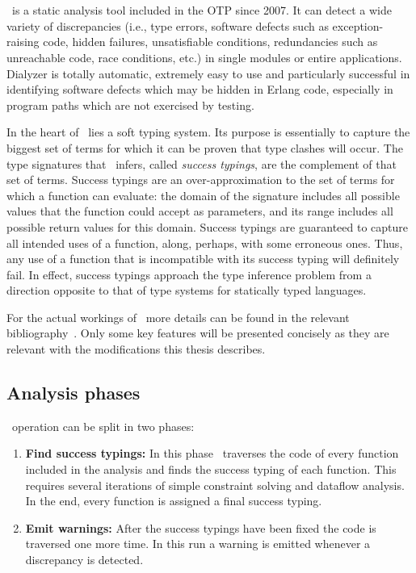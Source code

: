 \section{\dr}
\label{sct:dialyzer_preliminaries}

\dr\ is a static analysis tool included in the OTP since 2007. It can
detect a wide variety of discrepancies (i.e., type errors, software
defects such as exception-raising code, hidden failures, unsatisfiable
conditions, redundancies such as unreachable code, race conditions,
etc.) in single modules or entire applications. Dialyzer is totally
automatic, extremely easy to use and particularly successful in
identifying software defects which may be hidden in Erlang code,
especially in program paths which are not exercised by testing.

In the heart of \dr\ lies a soft typing system. Its purpose is
essentially to capture the biggest set of terms for which it can be
proven that type clashes will occur. The type signatures that
\dr\ infers, called \emph{success typings}, are the complement of that
set of terms. Success typings are an over-approximation to the set of
terms for which a function can evaluate: the domain of the signature
includes all possible values that the function could accept as
parameters, and its range includes all possible return values for this
domain. Success typings are guaranteed to capture all intended uses of
a function, along, perhaps, with some erroneous ones. Thus, any use of
a function that is incompatible with its success typing will
definitely fail. In effect, success typings approach the type
inference problem from a direction opposite to that of type systems
for statically typed languages.

For the actual workings of \dr\ more details can be found in the
relevant bibliography~\cite{Elli, type_system,
  springerlink:10.1007/978-3-540-30477-7_7, SuccessTypings@PPDP-06,
  GradualTyping@Erlang-08}. Only some key features will be presented
concisely as they are relevant with the modifications this thesis
describes.

\subsection{Analysis phases}

\dr\ operation can be split in two phases:

\begin{enumerate}
\item \textbf{Find success typings:} In this phase \dr\ traverses the
  code of every function included in the analysis and finds the
  success typing of each function. This requires several iterations of
  simple constraint solving and dataflow analysis. In the end, every
  function is assigned a final success typing.
\item \textbf{Emit warnings:} After the success typings have been
  fixed the code is traversed one more time. In this run a warning is
  emitted whenever a discrepancy is detected.
\end{enumerate}

